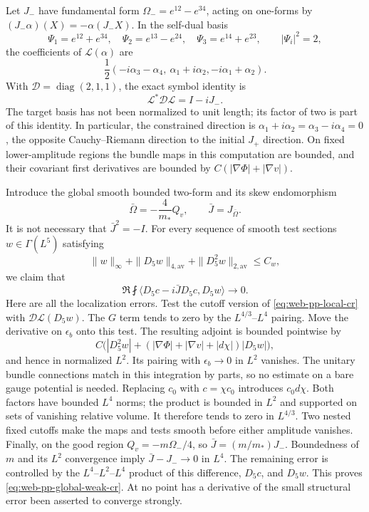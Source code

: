 Let \(J_-\) have fundamental form \(\Omega_-=e^{12}-e^{34}\), acting
on one-forms by \((J_-\alpha)(X)=-\alpha(J_-X)\).
In the self-dual basis
\[
 \Psi_1=e^{12}+e^{34},\quad\Psi_2=e^{13}-e^{24},\quad
 \Psi_3=e^{14}+e^{23},\qquad |\Psi_i|^2=2,
\]
the coefficients of \(\mathcal L(\alpha)\) are
\[
 \frac12(-i\alpha_3-\alpha_4,\ \alpha_1+i\alpha_2,
                                    -i\alpha_1+\alpha_2).
\]
With \(\mathcal D=\operatorname{diag}(2,1,1)\), the exact symbol
identity is
\begin{equation}
 \mathcal L^*\mathcal D\mathcal L=I-iJ_-.
 \label{eq:web-pp-cr-symbol}
\end{equation}
The target basis has not been normalized to unit length; its factor of two
is part of this identity.  In particular, the constrained direction is
\(\alpha_1+i\alpha_2=\alpha_3-i\alpha_4=0\), the opposite
Cauchy--Riemann direction to the initial \(J_+\) direction.
On fixed lower-amplitude regions the bundle maps in this computation are
bounded, and their covariant first derivatives are bounded by
\(C(|\nabla\Phi|+|\nabla v|)\).

Introduce the global smooth bounded two-form and its skew endomorphism
\[
 \bar\Omega=-\frac4{m_*}Q_v,\qquad \bar J=J_{\bar\Omega}.
\]
It is not necessary that \(\bar J^2=-I\).  For every sequence of smooth
test sections \(w\in\Gamma(L^5)\) satisfying
\begin{equation}
 \|w\|_\infty+\|D_5w\|_{4,\mathrm{av}}
                  +\|D_5^2w\|_{2,\mathrm{av}}\le C_w,
 \label{eq:web-pp-test-class}
\end{equation}
we claim that
\begin{equation}
 \Re\fint\langle D_5c-i\bar J D_5c,D_5w\rangle\longrightarrow0.
 \label{eq:web-pp-global-weak-cr}
\end{equation}
Here are all the localization errors.  Test the cutoff version of
\eqref{eq:web-pp-local-cr} with \(\mathcal D\mathcal L(D_5w)\).
The \(G\) term tends to zero by the \(L^{4/3}\)--\(L^4\) pairing.
Move the derivative on \(\epsilon_b\) onto this test.  The resulting
adjoint is bounded pointwise by
\[
 C\bigl(|D_5^2w|+
       (|\nabla\Phi|+|\nabla v|+|d\chi|)|D_5w|\bigr),
\]
and hence in normalized \(L^2\).  Its pairing with
\(\epsilon_b\to0\) in \(L^2\) vanishes.  The unitary bundle
connections match in this integration by parts, so no estimate on a bare
gauge potential is needed.  Replacing \(c_0\) with \(c=\chi c_0\)
introduces \(c_0d\chi\).  Both factors have bounded \(L^4\) norms;
the product is bounded in \(L^2\) and supported on sets of vanishing
relative volume.  It therefore tends to zero in \(L^{4/3}\).  Two nested
fixed cutoffs make the maps and tests smooth before either amplitude vanishes.
Finally, on the good region \(Q_v=-m\Omega_-/4\), so
\(\bar J=(m/m_*)J_-\).  Boundedness of \(m\) and its \(L^2\)
convergence imply \(\bar J-J_-\to0\) in \(L^4\).  The remaining
error is controlled by the \(L^4\)--\(L^2\)--\(L^4\) product of
this difference, \(D_5c\), and \(D_5w\).  This proves
\eqref{eq:web-pp-global-weak-cr}.  At no point has a derivative of the
small structural error been asserted to converge strongly.

